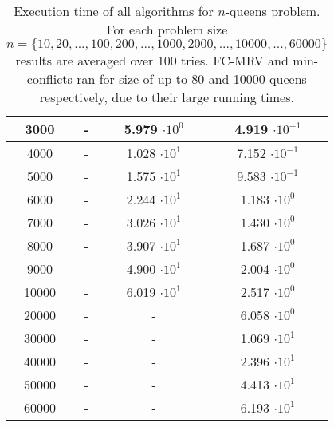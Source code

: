\begin{table}[htpb]
{\begin{tabular}{| c | c | c | c |}
\hline
3000 & - & 5.979 $\cdot 10^{0}$ & 4.919 $\cdot 10^{-1}$\\
\hline
4000 & - & 1.028 $\cdot 10^{1}$ & 7.152 $\cdot 10^{-1}$\\
\hline
5000 & - & 1.575 $\cdot 10^{1}$ & 9.583 $\cdot 10^{-1}$\\
\hline
6000 & - & 2.244 $\cdot 10^{1}$ & 1.183 $\cdot 10^{0}$\\
\hline
7000 & - & 3.026 $\cdot 10^{1}$ & 1.430 $\cdot 10^{0}$\\
\hline
8000 & - & 3.907 $\cdot 10^{1}$ & 1.687 $\cdot 10^{0}$\\
\hline
9000 & - & 4.900 $\cdot 10^{1}$ & 2.004 $\cdot 10^{0}$\\
\hline
10000 & - & 6.019 $\cdot 10^{1}$ & 2.517 $\cdot 10^{0}$\\
\hline
20000 & - & - & 6.058 $\cdot 10^{0}$\\
\hline
30000 & - & - & 1.069 $\cdot 10^{1}$\\
\hline
40000 & - & - & 2.396 $\cdot 10^{1}$\\
\hline
50000 & - & - & 4.413 $\cdot 10^{1}$\\
\hline
60000 & - & - & 6.193 $\cdot 10^{1}$\\
\hline
\end{tabular}
}%
\caption{Execution time of all algorithms for $n$-queens problem. For each problem size $n = \{10, 20,..., 100, 200,..., 1000, 2000,..., 10000,..., 60000\}$ results are averaged over 100 tries. FC-MRV and min-conflicts ran for size of up to 80 and 10000 queens respectively, due to their large running times.}
\label{table:execution-time}
\end{table}